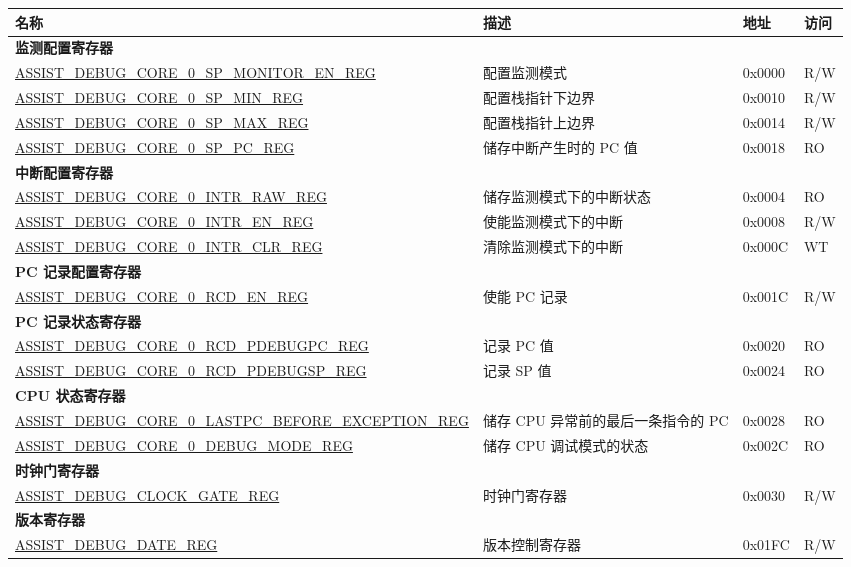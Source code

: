 \begin{longtable}{ | p{10cm} | p{4cm} | p{1.2cm} | p{1cm} | }
\hline\rowcolor{lightgray}
名称 & 描述 &  地址 & 访问 \\ \hline
\endhead
\multicolumn{4}{|l|}{\textbf{监测配置寄存器}} \\ \hline
\hyperref[regdesc:ASSISTDEBUGCORE0SPMONITORENREG]{ASSIST\_DEBUG\_CORE\_0\_SP\_MONITOR\_EN\_REG} & 配置监测模式 & 0x0000 & R/W \\ \hline
\hyperref[regdesc:ASSISTDEBUGCORE0SPMINREG]{ASSIST\_DEBUG\_CORE\_0\_SP\_MIN\_REG} & 配置栈指针下边界 & 0x0010 & R/W \\ \hline
\hyperref[regdesc:ASSISTDEBUGCORE0SPMAXREG]{ASSIST\_DEBUG\_CORE\_0\_SP\_MAX\_REG} & 配置栈指针上边界 & 0x0014 & R/W \\ \hline
\hyperref[regdesc:ASSISTDEBUGCORE0SPPCREG]{ASSIST\_DEBUG\_CORE\_0\_SP\_PC\_REG} & 储存中断产生时的 PC 值 & 0x0018 & RO \\ \hline
\multicolumn{4}{|l|}{\textbf{中断配置寄存器}} \\ \hline
\hyperref[regdesc:ASSISTDEBUGCORE0INTRRAWREG]{ASSIST\_DEBUG\_CORE\_0\_INTR\_RAW\_REG} & 储存监测模式下的中断状态 & 0x0004 & RO \\ \hline
\hyperref[regdesc:ASSISTDEBUGCORE0INTRENREG]{ASSIST\_DEBUG\_CORE\_0\_INTR\_EN\_REG} & 使能监测模式下的中断 & 0x0008 & R/W \\ \hline
\hyperref[regdesc:ASSISTDEBUGCORE0INTRCLRREG]{ASSIST\_DEBUG\_CORE\_0\_INTR\_CLR\_REG} & 清除监测模式下的中断  & 0x000C & WT \\ \hline
\multicolumn{4}{|l|}{\textbf{PC 记录配置寄存器}} \\ \hline
\hyperref[regdesc:ASSISTDEBUGCORE0RCDENREG]{ASSIST\_DEBUG\_CORE\_0\_RCD\_EN\_REG} & 使能 PC 记录 & 0x001C & R/W \\ \hline
\multicolumn{4}{|l|}{\textbf{PC 记录状态寄存器}} \\ \hline
\hyperref[regdesc:ASSISTDEBUGCORE0RCDPDEBUGPCREG]{ASSIST\_DEBUG\_CORE\_0\_RCD\_PDEBUGPC\_REG} & 记录 PC 值 & 0x0020 & RO \\ \hline
\hyperref[regdesc:ASSISTDEBUGCORE0RCDPDEBUGSPREG]{ASSIST\_DEBUG\_CORE\_0\_RCD\_PDEBUGSP\_REG} & 记录 SP 值 & 0x0024 & RO \\ \hline
\multicolumn{4}{|l|}{\textbf{CPU 状态寄存器}} \\ \hline
\hyperref[regdesc:ASSISTDEBUGCORE0LASTPCBEFOREEXCEPTIONREG]{ASSIST\_DEBUG\_CORE\_0\_LASTPC\_BEFORE\_EXCEPTION\_REG} & 储存 CPU 异常前的最后一条指令的 PC & 0x0028 & RO \\ \hline
\hyperref[regdesc:ASSISTDEBUGCORE0DEBUGMODEREG]{ASSIST\_DEBUG\_CORE\_0\_DEBUG\_MODE\_REG} & 储存 CPU 调试模式的状态 & 0x002C & RO \\ \hline
\multicolumn{4}{|l|}{\textbf{时钟门寄存器}} \\ \hline
\hyperref[regdesc:ASSISTDEBUGCLOCKGATEREG]{ASSIST\_DEBUG\_CLOCK\_GATE\_REG} & 时钟门寄存器 & 0x0030 & R/W \\ \hline
\multicolumn{4}{|l|}{\textbf{版本寄存器}} \\ \hline
\hyperref[regdesc:ASSISTDEBUGDATEREG]{ASSIST\_DEBUG\_DATE\_REG} & 版本控制寄存器 & 0x01FC & R/W \\ \hline
\end{longtable}
